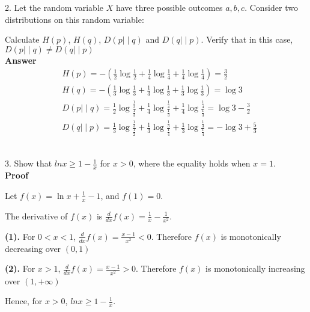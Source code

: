 \documentclass[12pt]{article}
\begin{document}
	\par
	2. Let the random variable $X$ have three possible outcomes {$a,b,c$}. Consider two distributions on this random variable:
	\begin{table}[H]
		\centering
	\end{table}
	Calculate $H(p)$, $H(q)$, $D(p{\mid\mid}q)$ and $D(q{\mid\mid}p)$. Verify that in this case, $D(p{\mid\mid}q)\not=D(q{\mid\mid}p)$ \\
	\textbf{Answer}
	\begin{align*}
		&H(p) = -(\frac{1}{2}\log\frac{1}{2} + \frac{1}{4}\log\frac{1}{4} + \frac{1}{4}\log\frac{1}{4}) = \frac{3}{2} \\
		&H(q) = -(\frac{1}{3}\log\frac{1}{3} + \frac{1}{3}\log\frac{1}{3} + \frac{1}{3}\log\frac{1}{3}) = \log3 \\
		&D(p{\mid\mid}q) = \frac{1}{2}\log\frac{\frac{1}{2}}{\frac{1}{3}} + \frac{1}{4}\log\frac{\frac{1}{4}}{\frac{1}{3}} + \frac{1}{4}\log\frac{\frac{1}{4}}{\frac{1}{3}} = \log3 - \frac{3}{2} \\
		&D(q{\mid\mid}p) = \frac{1}{3}\log\frac{\frac{1}{3}}{\frac{1}{2}} + \frac{1}{3}\log\frac{\frac{1}{3}}{\frac{1}{4}} + \frac{1}{3}\log\frac{\frac{1}{3}}{\frac{1}{4}} = -\log3+\frac{5}{3}
	\end{align*}
	\\
	\par
	3. Show that $lnx\geq1-\frac{1}{x}$ for $x>0$, where the equality holds when $x=1$. \\
	\textbf{Proof} \par
	Let $f(x) = \ln x + \frac{1}{x} - 1$, and $f(1) = 0$. \par
	The derivative of $f(x)$ is $\frac{d}{dx}f(x) = \frac{1}{x}-\frac{1}{x^2}$. \par
	\textbf{(1). }For $0<x<1$, $\frac{d}{dx}f(x) = \frac{x-1}{x^2} < 0$. Therefore $f(x)$ is monotonically decreasing over $(0,1)$ \par
	\textbf{(2). }For $x>1$, $\frac{d}{dx}f(x) = \frac{x-1}{x^2} > 0$. Therefore $f(x)$ is monotonically increasing over $(1, +\infty)$ \par
	Hence, for $x>0$, $lnx\geq 1-\frac{1}{x}$.\\
	
\end{document}
